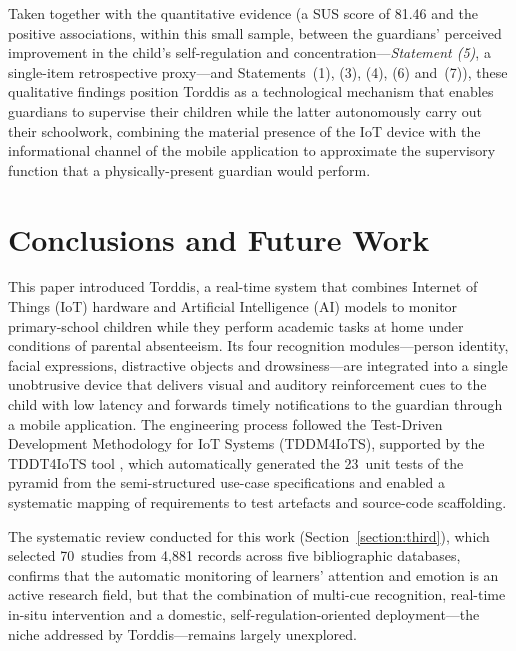 Taken together with the quantitative evidence (a SUS score of 81.46 and the positive associations, within this small sample, between the guardians' perceived improvement in the child's self-regulation and concentration---\textit{Statement (5)}, a single-item retrospective proxy---and Statements~(1), (3), (4), (6) and~(7)), these qualitative findings position Torddis as a technological mechanism that enables guardians to supervise their children while the latter autonomously carry out their schoolwork, combining the material presence of the IoT device with the informational channel of the mobile application to approximate the supervisory function that a physically-present guardian would perform.

\section{Conclusions and Future Work}
\label{section:eight}
This paper introduced Torddis, a real-time system that combines Internet of Things (IoT) hardware and Artificial Intelligence (AI) models to monitor primary-school children while they perform academic tasks at home under conditions of parental absenteeism. Its four recognition modules---person identity, facial expressions, distractive objects and drowsiness---are integrated into a single unobtrusive device that delivers visual and auditory reinforcement cues to the child with low latency and forwards timely notifications to the guardian through a mobile application. The engineering process followed the Test-Driven Development Methodology for IoT Systems (TDDM4IoTS), supported by the TDDT4IoTS tool \citep{Guerrero2024Test}, which automatically generated the 23~unit tests of the pyramid from the semi-structured use-case specifications and enabled a systematic mapping of requirements to test artefacts and source-code scaffolding.

The systematic review conducted for this work (Section~\ref{section:third}), which selected 70~studies from 4{,}881 records across five bibliographic databases, confirms that the automatic monitoring of learners' attention and emotion is an active research field, but that the combination of multi-cue recognition, real-time in-situ intervention and a domestic, self-regulation-oriented deployment---the niche addressed by Torddis---remains largely unexplored.

